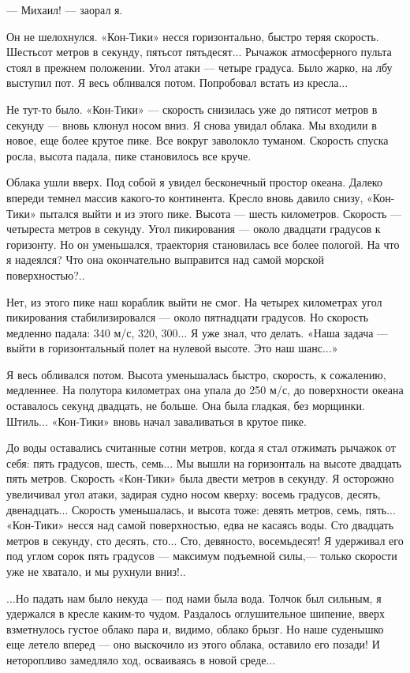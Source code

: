 \documentclass[11pt,a4paper,oneside]{article}
\begin{document}
— Михаил! — заорал я.

Он не шелохнулся. «Кон-Тики» несся горизонтально, быстро теряя скорость. Шестьсот метров в секунду, пятьсот пятьдесят... Рычажок атмосферного пульта стоял в прежнем положении. Угол атаки — четыре градуса. Было жарко, на лбу выступил пот. Я весь обливался потом. Попробовал встать из кресла...

Не тут-то было. «Кон-Тики» — скорость снизилась уже до пятисот метров в секунду — вновь клюнул носом вниз. Я снова увидал облака. Мы входили в новое, еще более крутое пике. Все вокруг заволокло туманом. Скорость спуска росла, высота падала, пике становилось все круче.

Облака ушли вверх. Под собой я увидел бесконечный простор океана. Далеко впереди темнел массив какого-то континента. Кресло вновь давило снизу, «Кон-Тики» пытался выйти и из этого пике. Высота — шесть километров. Скорость — четыреста метров в секунду. Угол пикирования — около двадцати градусов к горизонту. Но он уменьшался, траектория становилась все более пологой. На что я надеялся? Что она окончательно выправится над самой морской поверхностью?..

Нет, из этого пике наш кораблик выйти не смог. На четырех километрах угол пикирования стабилизировался — около пятнадцати градусов. Но скорость медленно падала: 340 м/с, 320, 300... Я уже знал, что делать. «Наша задача — выйти в горизонтальный полет на нулевой высоте. Это наш шанс...»

Я весь обливался потом. Высота уменьшалась быстро, скорость, к сожалению, медленнее. На полутора километрах она упала до 250 м/с, до поверхности океана оставалось секунд двадцать, не больше. Она была гладкая, без морщинки. Штиль... «Кон-Тики» вновь начал заваливаться в крутое пике.

До воды оставались считанные сотни метров, когда я стал отжимать рычажок от себя: пять градусов, шесть, семь... Мы вышли на горизонталь на высоте двадцать пять метров. Скорость «Кон-Тики» была двести метров в секунду. Я осторожно увеличивал угол атаки, задирая судно носом кверху: восемь градусов, десять, двенадцать... Скорость уменьшалась, и высота тоже: девять метров, семь, пять... «Кон-Тики» несся над самой поверхностью, едва не касаясь воды. Сто двадцать метров в секунду, сто десять, сто... Сто, девяносто, восемьдесят! Я удерживал его под углом сорок пять градусов — максимум подъемной силы,— только скорости уже не хватало, и мы рухнули вниз!..

...Но падать нам было некуда — под нами была вода. Толчок был сильным, я удержался в кресле каким-то чудом. Раздалось оглушительное шипение, вверх взметнулось густое облако пара и, видимо, облако брызг. Но наше суденышко еще летело вперед — оно выскочило из этого облака, оставило его позади! И неторопливо замедляло ход, осваиваясь в новой среде...
\end{document}
